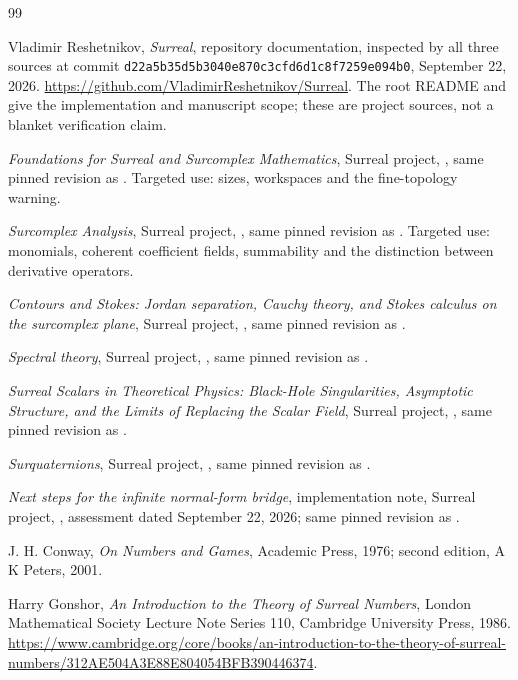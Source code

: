 \documentclass[11pt,letterpaper]{article}
\theoremstyle{definition}
\theoremstyle{remark}
\newcommand{\repoSHA}{d22a5b35d5b3040e870c3cfd6d1c8f7259e094b0}
\begin{document}
\begin{thebibliography}{99}
\small\raggedright
{}
Vladimir Reshetnikov, \emph{Surreal}, repository documentation, inspected by all
three sources at commit \texttt{\repoSHA}, September 22, 2026.
\url{https://github.com/VladimirReshetnikov/Surreal}.
The root README and  give the implementation and manuscript
scope; these are project sources, not a blanket verification claim.

\emph{Foundations for Surreal and Surcomplex Mathematics}, Surreal project,
, same pinned
revision as \cite{Repo}. Targeted use: sizes, workspaces and the fine-topology
warning.

\emph{Surcomplex Analysis}, Surreal project,
, same pinned revision as
\cite{Repo}. Targeted use: monomials, coherent coefficient fields,
summability and the distinction between derivative operators.

\emph{Contours and Stokes: Jordan separation, Cauchy theory, and Stokes calculus
on the surcomplex plane}, Surreal project,
, same pinned revision as \cite{Repo}.

\emph{Spectral theory}, Surreal project, ,
same pinned revision as \cite{Repo}.

\emph{Surreal Scalars in Theoretical Physics: Black-Hole Singularities,
Asymptotic Structure, and the Limits of Replacing the Scalar Field}, Surreal
project, , same pinned revision
as \cite{Repo}.

\emph{Surquaternions}, Surreal project, ,
same pinned revision as \cite{Repo}.

\emph{Next steps for the infinite normal-form bridge}, implementation note,
Surreal project, , assessment dated September
22, 2026; same pinned revision as \cite{Repo}.

J. H. Conway, \emph{On Numbers and Games}, Academic Press, 1976; second edition,
A K Peters, 2001.

Harry Gonshor, \emph{An Introduction to the Theory of Surreal Numbers},
London Mathematical Society Lecture Note Series 110, Cambridge University
Press, 1986.
\url{https://www.cambridge.org/core/books/an-introduction-to-the-theory-of-surreal-numbers/312AE504A3E88E804054BFB390446374}.


\end{thebibliography}
\end{document}
